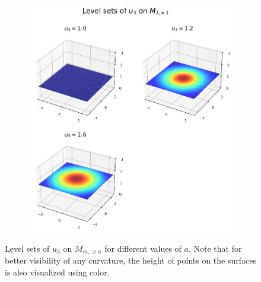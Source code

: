 \documentclass[titlepage,numbers=noenddot,headinclude,oneside,%
footinclude=true,cleardoublepage=empty,%
BCOR=5mm,paper=a4,fontsize=11pt,%
english,%
]{scrartcl}
\begin{document}
\begin{figure}
\begin{subfigure}{.45\textwidth}
    \end{subfigure}
    \begin{subfigure}{.45\textwidth}
        \includegraphics[width=\textwidth]{figures/level_sets_u3_modified_with_a_1.png}
    \end{subfigure}
    \label{fig:level_sets_modified}
    \caption{Level sets of \( u_3 \) on \( M_{m,\geq a} \) for different values of \( a \). Note that for better visibility of any curvature, the height of points on the surfaces is also visualized using color.}
\end{figure}

\newpage
\appendix
\end{document}
